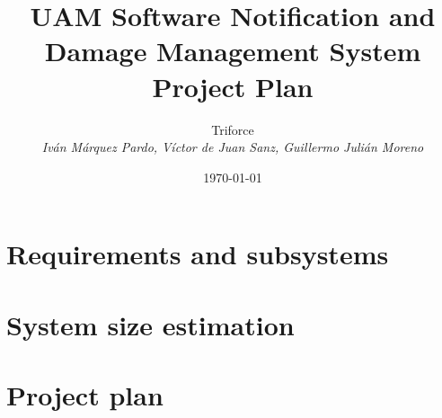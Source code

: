\documentclass{report}
\title{UAM Software Notification and Damage Management System \\ Project Plan}
\date{\today}
\author{{\Large Triforce} \\ \vspace{5pt} \textit{Iván Márquez Pardo, Víctor de Juan Sanz, Guillermo Julián Moreno}}
\begin{document}
\maketitle
\tableofcontents
\newpage
\pagestyle{plain}

\chapter{Requirements and subsystems}



\chapter{System size estimation}


\chapter{Project plan}

\end{document}
